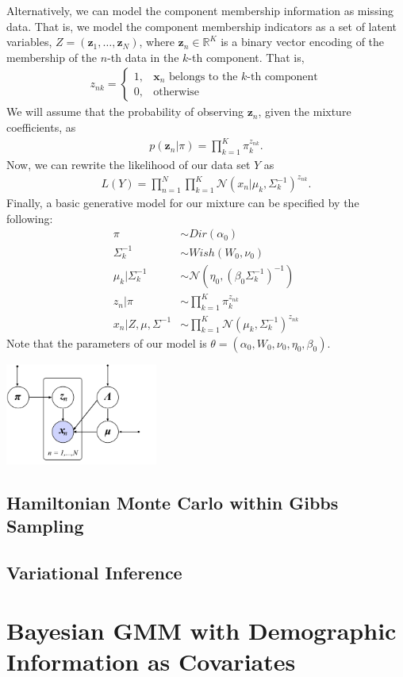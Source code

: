 \documentclass[twoside]{article}
\newcommand{\N}{\mathcal{N}}
\newcommand{\bR}{\mathbb{R}}
\newcommand{\vx}{\mathbf{x}}
\newcommand{\vz}{\mathbf{z}}
\theoremstyle{theorem}
\theoremstyle{theorem}
\theoremstyle{theorem}
\theoremstyle{lemma}
\theoremstyle{definition}
\theoremstyle{example}
\begin{document}
Alternatively, we can model the component membership information as missing data. That is, we model the component membership indicators as a set of latent variables, $Z = (\vz_1, \ldots, \vz_N)$, where $\vz_n \in \bR^K$ is a binary vector encoding of the membership of the $n$-th data in the $k$-th component. That is,
\begin{align}
z_{nk} = \begin{cases}
1, & \vx_n\text{ belongs to the $k$-th component}\\
0, & \text{otherwise}
\end{cases}
\end{align}
We will assume that the probability of observing $\vz_n$, given the mixture coefficients, as
\begin{align}
p(\vz_n | \pi) = \prod_{k=1}^K \pi_k^{z_{nk}}.
\end{align}
Now, we can rewrite the likelihood of our data set $Y$ as
\begin{align}
L(Y) = \prod_{n=1}^N\prod_{k=1}^K \N(x_n| \mu_k, \Sigma^{-1}_k)^{z_{nk}}.
\end{align}
Finally, a basic generative model for our mixture can be specified by the following:
\begin{align}
\pi &\sim Dir(\alpha_0)\\
\Sigma^{-1}_k &\sim Wish(W_0, \nu_0)\\
\mu_k | \Sigma^{-1}_k &\sim \N(\eta_0, (\beta_0 \Sigma^{-1}_k )^{-1})\\
z_n | \pi &\sim \prod_{k=1}^K \pi_k^{z_{nk}}\\
x_n | Z, \mu, \Sigma^{-1} &\sim \prod_{k=1}^K \N(\mu_k, \Sigma^{-1}_k)^{z_{nk}}
\end{align}
Note that the parameters of our model is $\theta = (\alpha_0, W_0, \nu_0, \eta_0, \beta_0)$. 
\begin{center}
\includegraphics[width=50mm]{graph_model}
\end{center}

\subsection{Hamiltonian Monte Carlo within Gibbs Sampling}

\subsection{Variational Inference}

\section{Bayesian GMM with Demographic Information as Covariates}


\end{document}
